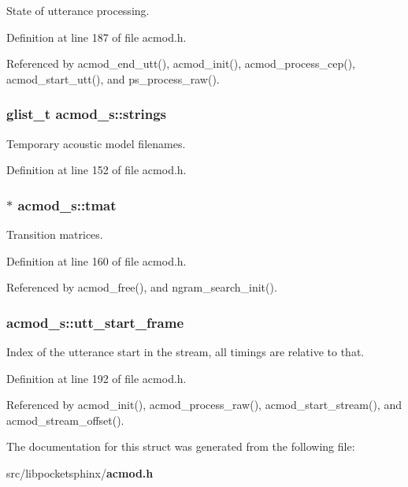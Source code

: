 State of utterance processing. 



Definition at line 187 of file acmod.\-h.



Referenced by acmod\-\_\-end\-\_\-utt(), acmod\-\_\-init(), acmod\-\_\-process\-\_\-cep(), acmod\-\_\-start\-\_\-utt(), and ps\-\_\-process\-\_\-raw().

\subsubsection[{strings}]{\setlength{\rightskip}{0pt plus 5cm}glist\-\_\-t acmod\-\_\-s\-::strings}\label{structacmod__s_a9f6b699a0fbd43cf7ababab6f0ab81be}


Temporary acoustic model filenames. 



Definition at line 152 of file acmod.\-h.

\subsubsection[{tmat}]{$\ast$ acmod\-\_\-s\-::tmat}\label{structacmod__s_aaa3982184a49f0d61e397ba89f486259}


Transition matrices. 



Definition at line 160 of file acmod.\-h.



Referenced by acmod\-\_\-free(), and ngram\-\_\-search\-\_\-init().

\subsubsection[{utt\-\_\-start\-\_\-frame}]{ acmod\-\_\-s\-::utt\-\_\-start\-\_\-frame}\label{structacmod__s_aecf7cf72f18a8ecb1cc8e96928bc1ad4}


Index of the utterance start in the stream, all timings are relative to that. 



Definition at line 192 of file acmod.\-h.



Referenced by acmod\-\_\-init(), acmod\-\_\-process\-\_\-raw(), acmod\-\_\-start\-\_\-stream(), and acmod\-\_\-stream\-\_\-offset().



The documentation for this struct was generated from the following file\-:\begin{DoxyCompactItemize}
\item 
src/libpocketsphinx/{\bf acmod.\-h}\end{DoxyCompactItemize}
